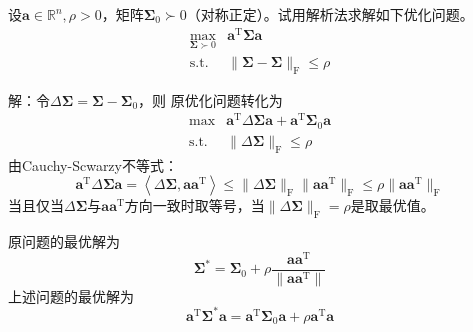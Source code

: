 \begin{example}
    设$\boldsymbol{a}\in\mathbb{R}^n,\rho>0$，矩阵$\boldsymbol{\Sigma}_0\succ0$（对称正定）。试用解析法求解如下优化问题。
    \[
        \begin{array}{rl}
            \max\limits_{\boldsymbol{\Sigma}\succ 0} & \boldsymbol{a}^{\mathrm{T}}\boldsymbol{\Sigma}\boldsymbol{a}\\
            \operatorname{s.t.} & \|\boldsymbol{\Sigma}-\boldsymbol{\Sigma}\|_{\mathrm{F}}\leqslant \rho
        \end{array}
    \]

    解：令$\Delta\boldsymbol{\Sigma} = \boldsymbol{\Sigma}-\boldsymbol{\Sigma}_0$，则
    原优化问题转化为
    \[
        \begin{array}{rl}
            \max & \boldsymbol{a}^{\mathrm{T}}\Delta\boldsymbol{\Sigma}\boldsymbol{a}+\boldsymbol{a}^{\mathrm{T}}\boldsymbol{\Sigma}_0\boldsymbol{a}\\
            \operatorname{s.t.} & \|\Delta\boldsymbol{\Sigma}\|_{\mathrm{F}}\leqslant \rho
        \end{array}
    \]
    由Cauchy-Scwarzy不等式：
    \[
        \boldsymbol{a}^{\mathrm{T}}\Delta\boldsymbol{\Sigma}\boldsymbol{a} = \left< \Delta\boldsymbol{\Sigma},\boldsymbol{a}\boldsymbol{a}^{\mathrm{T}} \right>\leqslant \|\Delta\boldsymbol{\Sigma}\|_{\mathrm{F}}\|\boldsymbol{a}\boldsymbol{a}^{\mathrm{T}}\|_{\mathrm{F}}\leqslant \rho\|\boldsymbol{a}\boldsymbol{a}^{\mathrm{T}}\|_{\mathrm{F}}
    \]
    当且仅当$\Delta\boldsymbol{\Sigma}$与$\boldsymbol{a}\boldsymbol{a}^{\mathrm{T}}$方向一致时取等号，当$\|\Delta\boldsymbol{\Sigma}\|_{\mathrm{F}} = \rho$是取最优值。

    原问题的最优解为
    \[
        \boldsymbol{\Sigma}^{*} = \boldsymbol{\Sigma}_0+\rho\dfrac{\boldsymbol{a}\boldsymbol{a}^{\mathrm{T}}}{\|\boldsymbol{a}\boldsymbol{a}^{\mathrm{T}}\|}
    \]
    上述问题的最优解为
    \[
        \boldsymbol{a}^{\mathrm{T}}\boldsymbol{\Sigma}^*\boldsymbol{a} = \boldsymbol{a}^{\mathrm{T}}\boldsymbol{\Sigma}_0\boldsymbol{a} + \rho\boldsymbol{a}^{\mathrm{T}}\boldsymbol{a}
    \]
\end{example}

